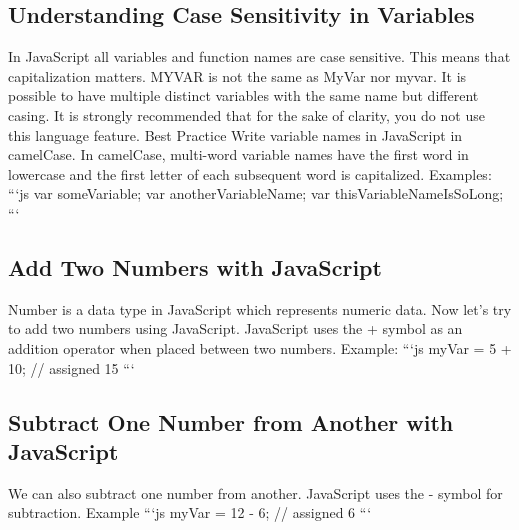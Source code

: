 \documentclass{article}%
\begin{document}
\subsection{Understanding Case Sensitivity in Variables}%
\label{subsec:UnderstandingCaseSensitivityinVariables}%
In JavaScript all variables and function names are case sensitive. This means that capitalization matters.\newline%
MYVAR is not the same as MyVar nor myvar. It is possible to have multiple distinct variables with the same name but different casing. It is strongly recommended that for the sake of clarity, you do not use this language feature.\newline%
Best Practice\newline%
Write variable names in JavaScript in camelCase. In camelCase, multi{-}word variable names have the first word in lowercase and the first letter of each subsequent word is capitalized.\newline%
Examples:\newline%
```js\newline%
var someVariable;\newline%
var anotherVariableName;\newline%
var thisVariableNameIsSoLong;\newline%
```\newline%

%
\subsection{Add Two Numbers with JavaScript}%
\label{subsec:AddTwoNumberswithJavaScript}%
Number is a data type in JavaScript which represents numeric data.\newline%
Now let's try to add two numbers using JavaScript.\newline%
JavaScript uses the + symbol as an addition operator when placed between two numbers.\newline%
Example:\newline%
```js\newline%
myVar = 5 + 10; // assigned 15\newline%
```\newline%

%
\subsection{Subtract One Number from Another with JavaScript}%
\label{subsec:SubtractOneNumberfromAnotherwithJavaScript}%
We can also subtract one number from another.\newline%
JavaScript uses the {-} symbol for subtraction.\newline%
Example\newline%
```js\newline%
myVar = 12 {-} 6; // assigned 6\newline%
```\newline%
\end{document}
